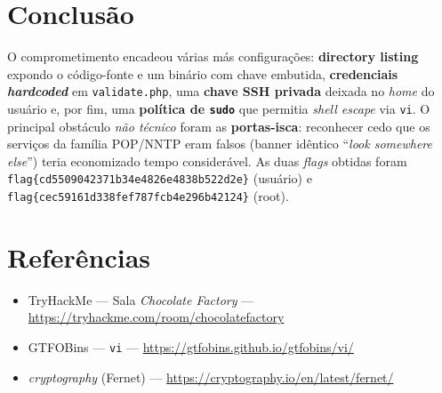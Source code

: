 \documentclass[12pt,a4paper]{article}
\begin{document}
\section{Conclusão}
O comprometimento encadeou várias más configurações:
\textbf{directory listing} expondo o código-fonte e um binário com chave
embutida, \textbf{credenciais \emph{hardcoded}} em \texttt{validate.php}, uma
\textbf{chave SSH privada} deixada no \emph{home} do usuário e, por fim, uma
\textbf{política de \texttt{sudo}} que permitia \emph{shell escape} via
\texttt{vi}. O principal obstáculo \emph{não técnico} foram as \textbf{portas-isca}:
reconhecer cedo que os serviços da família POP/NNTP eram falsos
(banner idêntico ``\emph{look somewhere else}'') teria economizado tempo
considerável. As duas \emph{flags} obtidas foram
\texttt{flag\{cd5509042371b34e4826e4838b522d2e\}} (usuário) e
\texttt{flag\{cec59161d338fef787fcb4e296b42124\}} (root).

\section{Referências}
\begin{itemize}[leftmargin=1.5em]
  \item TryHackMe --- Sala \emph{Chocolate Factory} ---
        \url{https://tryhackme.com/room/chocolatefactory}
  \item GTFOBins --- \texttt{vi} ---
        \url{https://gtfobins.github.io/gtfobins/vi/}
  \item \emph{cryptography} (Fernet) ---
        \url{https://cryptography.io/en/latest/fernet/}
\end{itemize}
\end{document}

